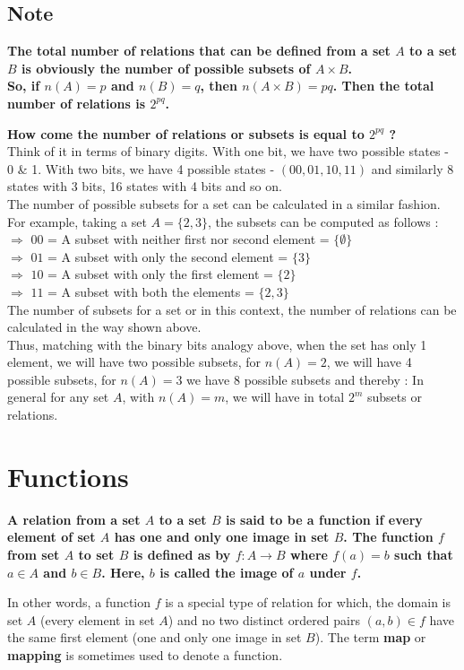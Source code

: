 \documentclass[12pt, letterpaper]{article}
\begin{document}
\subsection{Note}
\begin{displayquote}
\textbf{The total number of relations that can be defined from a set $A$ to a set $B$ is obviously the number of possible subsets of $A \times B$.\\
So, if $n(A) = p$ and $n(B) = q$, then $n(A \times B) = pq$. Then the total number of relations is $2^{pq}$.}
\end{displayquote}
\textbf{How come the number of relations or subsets is equal to $2^{pq}$ ?}\\
Think of it in terms of binary digits. With one bit, we have two possible states - 0 \& 1. With two bits, we have 4 possible states - $(00,01,10,11)$ and similarly 8 states with 3 bits, 16 states with 4 bits and so on.\\
The number of possible subsets for a set can be calculated in a similar fashion. For example, taking a set $A = \{2,3\}$, the subsets can be computed as follows : \\
$\Rightarrow$ $00$ = A subset with neither first nor second element = $\{\emptyset\}$\\
$\Rightarrow$ $01$ = A subset with only the second element = $\{3\}$\\
$\Rightarrow$ $10$ = A subset with only the first element = $\{2\}$\\
$\Rightarrow$ $11$ = A subset with both the elements = $\{2,3\}$\\
The number of subsets for a set or in this context, the number of relations can be calculated in the way shown above.\\
Thus, matching with the binary bits analogy above, when the set has only 1 element, we will have two possible subsets, for $n(A) = 2$, we will have 4 possible subsets, for $n(A) = 3$ we have 8 possible subsets and thereby : In general for any set $A$, with $n(A) = m$, we will have in total $2^m$ subsets or relations.

\section{Functions}
\begin{displayquote}
\textbf{A relation from a set $A$ to a set $B$ is said to be a function if every element of set $A$ has one and only one image in set $B$. The function $f$ from set $A$ to set $B$ is defined as by $f : A \rightarrow B$ where $f(a) = b$ such that $a \in A$ and $b \in B$. Here, $b$ is called the image of $a$ under $f$.}
\end{displayquote}
In other words, a function $f$ is a special type of relation for which, the domain is set $A$ (every element in set $A$) and no two distinct ordered pairs $(a,b) \in f$ have the same first element (one and only one image in set $B$). The term \textbf{map} or \textbf{mapping} is sometimes used to denote a function.
\end{document}
